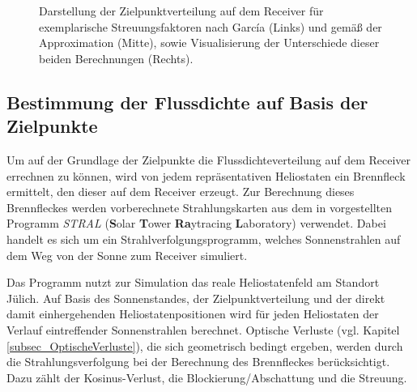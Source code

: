 \begin{figure}[h!]
    \centering
    \setlength{\fboxsep}{1pt}
    \setlength{\fboxrule}{1pt}
    \caption[Darstellung der Zielpunktverteilung auf dem Receiver für exemplarische Streuungsfaktoren nach García und gemäß der Approximation, sowie Visualisierung der Unterschiede dieser beiden Berechnungen.]{Darstellung der Zielpunktverteilung auf dem Receiver für exemplarische Streuungsfaktoren nach García (Links) und gemäß der Approximation (Mitte), sowie Visualisierung der Unterschiede dieser beiden Berechnungen (Rechts).}
    \label{fig_GüteApprox}
\end{figure}

\subsection{Bestimmung der Flussdichte auf Basis der Zielpunkte} \label{subsec_VerknüfungZielpunkteEinstrahlung}
Um auf der Grundlage der Zielpunkte die Flussdichteverteilung auf dem Receiver errechnen zu können, wird von jedem repräsentativen Heliostaten ein Brennfleck ermittelt, den dieser auf dem Receiver erzeugt.
Zur Berechnung dieses Brennfleckes werden vorberechnete Strahlungskarten aus dem in \cite[S.53ff]{DissBelhomme} vorgestellten Programm \textit{STRAL} (\textbf{S}olar \textbf{T}ower \textbf{Ra}ytracing \textbf{L}aboratory) verwendet.
Dabei handelt es sich um ein Strahlverfolgungsprogramm, welches Sonnenstrahlen auf dem Weg von der Sonne zum Receiver simuliert.

Das Programm nutzt zur Simulation das reale Heliostatenfeld am Standort Jülich.
Auf Basis des Sonnenstandes, der Zielpunktverteilung und der direkt damit einhergehenden Heliostatenpositionen wird für jeden Heliostaten der Verlauf eintreffender Sonnenstrahlen berechnet.
Optische Verluste (vgl. Kapitel \ref{subsec_OptischeVerluste}), die sich geometrisch bedingt ergeben, werden durch die Strahlungsverfolgung bei der Berechnung des Brennfleckes berücksichtigt.
Dazu zählt der Kosinus-Verlust, die Blockierung/Abschattung und die Streuung.

